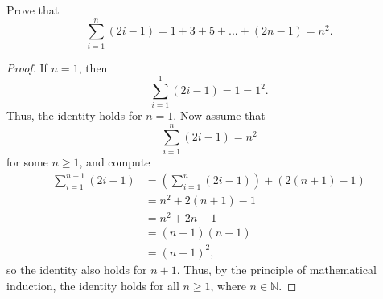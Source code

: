 \documentclass[11pt]{article}
\begin{document}
\newpage

\subsubsection{}
Prove that
\[
	\sum_{i=1}^{n} (2i-1) = 1 + 3 + 5 + ... + (2n-1) = n^2.
\]
\begin{proof}
	If $n=1$, then
	\[
		\sum_{i=1}^{1} (2i-1) = 1 = 1^2.
	\]
	Thus, the identity holds for $n=1$. Now assume that
	\[
		\sum_{i=1}^{n} (2i-1) = n^2
	\]
	for some $n \geq 1$, and compute
	\begin{align*}
		\sum_{i=1}^{n+1} (2i-1) & = \left( \sum_{i=1}^{n} (2i-1) \right) + \left(2(n+1)-1\right) \\
				        & = n^2 + 2(n+1) - 1 \\
				        & = n^2 + 2n + 1 \\
				        & = (n+1)(n+1) \\
				        & = (n+1)^2,
	\end{align*}
	so the identity also holds for $n+1$. Thus, by the principle of mathematical induction,
	the identity holds for all $n \geq 1$, where $n \in \mathbb{N}$.
\end{proof}
\end{document}
